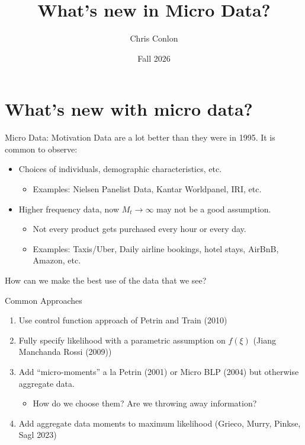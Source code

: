 \documentclass[aspectratio=169,10pt]{beamer}
\title{What's new in Micro Data?}
\author{Chris Conlon}
\institute{NYU Stern}
\date{Fall 2026}
\begin{document}
\begin{frame}
\titlepage
\end{frame}


\section*{What's new with micro data?}

\begin{frame}{Micro Data: Motivation}
Data are a lot better than they were in 1995. It is common to observe:
\begin{itemize}
\item Choices of individuals, demographic characteristics, etc.
\begin{itemize}
\item Examples: Nielsen Panelist Data, Kantar Worldpanel, IRI, etc.
\end{itemize}
\item Higher frequency data, now $M_t \rightarrow \infty$ may not be a good assumption.
\begin{itemize}
    \item Not every product gets purchased every hour or every day.
    \item Examples: Taxis/Uber, Daily airline bookings, hotel stays, AirBnB, Amazon, etc.
\end{itemize}
\end{itemize}
How can we make the best use of the data that we see?
\end{frame}


\begin{frame}{Common Approaches}
\begin{enumerate}
\item Use control function approach of Petrin and Train (2010)
\item Fully specify likelihood with a parametric assumption on $f(\xi)$ (Jiang Manchanda Rossi (2009))
\item Add ``micro-moments'' a la Petrin (2001) or Micro BLP (2004) but otherwise aggregate data.
\begin{itemize}
\item How do we choose them? Are we throwing away information?
\end{itemize}
\item Add aggregate data moments to maximum likelihood (Grieco, Murry, Pinkse, Sagl 2023)
\end{enumerate}
\end{frame}
\end{document}
